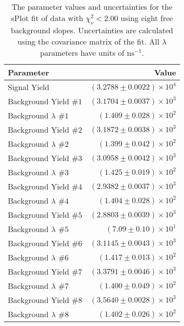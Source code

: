 
\begin{table}[ht]
    \begin{center}
        \begin{tabular}{lr}\toprule
            Parameter & Value \\\midrule
            Signal Yield & $(3.2788 \pm 0.0022) \times 10^{4}$ \\
            Background Yield $\#1$ & $(3.1704 \pm 0.0037) \times 10^{3}$ \\
            Background $\lambda$ $\#1$ & $(1.409 \pm 0.028) \times 10^{2}$ \\
            Background Yield $\#2$ & $(3.1872 \pm 0.0038) \times 10^{3}$ \\
            Background $\lambda$ $\#2$ & $(1.399 \pm 0.042) \times 10^{2}$ \\
            Background Yield $\#3$ & $(3.0958 \pm 0.0042) \times 10^{3}$ \\
            Background $\lambda$ $\#3$ & $(1.425 \pm 0.019) \times 10^{2}$ \\
            Background Yield $\#4$ & $(2.9382 \pm 0.0037) \times 10^{3}$ \\
            Background $\lambda$ $\#4$ & $(1.404 \pm 0.028) \times 10^{2}$ \\
            Background Yield $\#5$ & $(2.8803 \pm 0.0039) \times 10^{3}$ \\
            Background $\lambda$ $\#5$ & $(7.09 \pm 0.10) \times 10^{1}$ \\
            Background Yield $\#6$ & $(3.1145 \pm 0.0043) \times 10^{3}$ \\
            Background $\lambda$ $\#6$ & $(1.417 \pm 0.013) \times 10^{2}$ \\
            Background Yield $\#7$ & $(3.3791 \pm 0.0046) \times 10^{3}$ \\
            Background $\lambda$ $\#7$ & $(1.400 \pm 0.049) \times 10^{2}$ \\
            Background Yield $\#8$ & $(3.5640 \pm 0.0028) \times 10^{3}$ \\
            Background $\lambda$ $\#8$ & $(1.402 \pm 0.026) \times 10^{2}$ \\\bottomrule
        \end{tabular}
        \caption{The parameter values and uncertainties for the sPlot fit of data with $\chi^2_\nu < 2.00$ using eight free background slopes. Uncertainties are calculated using the covariance matrix of the fit. All $\lambda$ parameters have units of $\si{\nano\second}^{-1}$.}\label{tab:splot-fit-results-chisqdof-2.00-free-8}
    \end{center}
\end{table}
